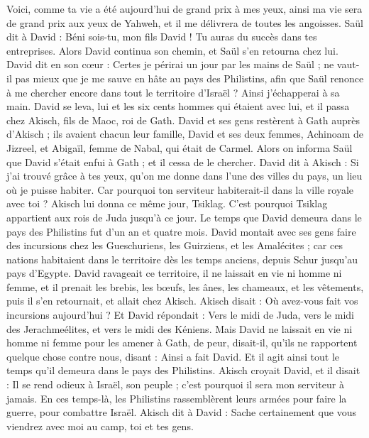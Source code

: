 \begin{multicols}{2}
Voici, comme ta vie a été aujourd'hui de grand prix à mes yeux, ainsi ma vie sera de grand prix aux yeux de Yahweh, et il me délivrera de toutes les angoisses.
Saül dit à David : Béni sois-tu, mon fils David ! Tu auras du succès dans tes entreprises. Alors David continua son chemin, et Saül s'en retourna chez lui.
\VerseOne{}David dit en son cœur : Certes je périrai un jour par les mains de Saül ; ne vaut-il pas mieux que je me sauve en hâte au pays des Philistins, afin que Saül renonce à me chercher encore dans tout le territoire d'Israël ? Ainsi j’échapperai à sa main.
David se leva, lui et les six cents hommes qui étaient avec lui, et il passa chez Akisch, fils de Maoc, roi de Gath.
David et ses gens restèrent à Gath auprès d’Akisch ; ils avaient chacun leur famille, David et ses deux femmes, Achinoam de Jizreel, et Abigaïl, femme de Nabal, qui était de Carmel.
Alors on informa Saül que David s'était enfui à Gath ; et il cessa de le chercher.
David dit à Akisch : Si j'ai trouvé grâce à tes yeux, qu'on me donne dans l'une des villes du pays, un lieu où je puisse habiter. Car pourquoi ton serviteur habiterait-il dans la ville royale avec toi ?
Akisch lui donna ce même jour, Tsiklag. C'est pourquoi Tsiklag appartient aux rois de Juda jusqu'à ce jour.
Le temps que David demeura dans le pays des Philistins fut d’un an et quatre mois.
David montait avec ses gens faire des incursions chez les Gueschuriens, les Guirziens, et les Amalécites ; car ces nations habitaient dans le territoire dès les temps anciens, depuis Schur jusqu'au pays d'Egypte.
David ravageait ce territoire, il ne laissait en vie ni homme ni femme, et il prenait les brebis, les bœufs, les ânes, les chameaux, et les vêtements, puis il s'en retournait, et allait chez Akisch.
Akisch disait : Où avez-vous fait vos incursions aujourd'hui ? Et David répondait : Vers le midi de Juda, vers le midi des Jerachmeélites, et vers le midi des Kéniens.
Mais David ne laissait en vie ni homme ni femme pour les amener à Gath, de peur, disait-il, qu'ils ne rapportent quelque chose contre nous, disant : Ainsi a fait David. Et il agit ainsi tout le temps qu'il demeura dans le pays des Philistins.
Akisch croyait David, et il disait : Il se rend odieux à Israël, son peuple ; c'est pourquoi il sera mon serviteur à jamais.
\VerseOne{}En ces temps-là, les Philistins rassemblèrent leurs armées pour faire la guerre, pour combattre Israël. Akisch dit à David : Sache certainement que vous viendrez avec moi au camp, toi et tes gens.

\end{multicols}
